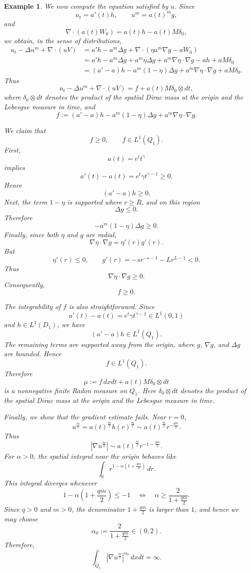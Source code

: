 \documentclass{amsart}
\newtheorem{example}[defn]{Example}
\numberwithin{equation}{section}
\begin{document}
\begin{example}
We now compute the equation satisfied by \(u\). Since
\[
u_t=a'(t)h,
\qquad
u^m=a(t)^m g,
\]
and
\[
\nabla\cdot(a(t)W_0)
=
a(t)h-a(t)M\delta_0,
\]
we obtain, in the sense of distributions,
\[
\begin{aligned}
u_t-\Delta u^m+\nabla\cdot(uV)
&=
a'h-a^m\Delta g
+
\nabla\cdot\left(\eta a^m\nabla g-aW_0\right)\\
&=
a'h-a^m\Delta g
+
a^m\eta\Delta g
+
a^m\nabla\eta\cdot\nabla g
-a h
+aM\delta_0\\
&=
(a'-a)h
-a^m(1-\eta)\Delta g
+
a^m\nabla\eta\cdot\nabla g
+
aM\delta_0.
\end{aligned}
\]
Thus
\[
u_t-\Delta u^m+\nabla\cdot(uV)
=
f+a(t)M\delta_0\otimes dt,
\]
where \(\delta_0\otimes dt\) denotes the product of the spatial Dirac mass at the origin and the Lebesgue measure in time, and
\[
f:=
(a'-a)h
-a^m(1-\eta)\Delta g
+
a^m\nabla\eta\cdot\nabla g.
\]

We claim that
\[
f\ge0,
\qquad
f\in L^1(Q_1).
\]
First,
\[
a(t)=e^t t^\gamma
\]
implies
\[
a'(t)-a(t)
=
e^t\gamma t^{\gamma-1}\ge0.
\]
Hence
\[
(a'-a)h\ge0.
\]
Next, the term \(1-\eta\) is supported where \(r\ge R\), and on this region
\[
\Delta g\le0.
\]
Therefore
\[
-a^m(1-\eta)\Delta g\ge0.
\]
Finally, since both \(\eta\) and \(g\) are radial,
\[
\nabla\eta\cdot\nabla g=\eta'(r)g'(r).
\]
But
\[
\eta'(r)\le0,
\qquad
g'(r)=-sr^{-s-1}-Lr^{L-1}<0.
\]
Thus
\[
\nabla\eta\cdot\nabla g\ge0.
\]
Consequently,
\[
f\ge0.
\]

The integrability of \(f\) is also straightforward. Since
\[
a'(t)-a(t)=e^t\gamma t^{\gamma-1}\in L^1(0,1)
\]
and \(h\in L^1(D_1)\), we have
\[
(a'-a)h\in L^1(Q_1).
\]
The remaining terms are supported away from the origin, where \(g\),
\(\nabla g\), and \(\Delta g\) are bounded. Hence
\[
f\in L^1(Q_1).
\]
Therefore
\[
\mu:=f\,dxdt+a(t)M\delta_0\otimes dt
\]
is a nonnegative finite Radon measure on \(Q_1\).
Here \(\delta_0\otimes dt\) denotes the product of the spatial Dirac mass at the origin and the Lebesgue measure in time.

Finally, we show that the gradient estimate fails. Near \(r=0\),
\[
u^{\frac{m}{2}}
=
a(t)^{\frac{m}{2}}h(r)^{\frac{m}{2}}
\sim
a(t)^{\frac{m}{2}}r^{-\frac{qm}{2}}.
\]
Thus
\[
\left|\nabla u^{\frac{m}{2}}\right|
\sim
a(t)^{\frac{m}{2}}r^{-1-\frac{qm}{2}}.
\]
For \(\alpha>0\), the spatial integral near the origin behaves like
\[
\int_0 r^{1-\alpha\left(1+\frac{qm}{2}\right)}\,dr.
\]
This integral diverges whenever
\[
1-\alpha\left(1+\frac{qm}{2}\right)\le -1
\quad \Longleftrightarrow \quad
\alpha\ge \frac{2}{1+\frac{qm}{2}}.
\]
Since \(q>0\) and \(m>0\), the denominator $1+\frac{qm}{2}$ is larger than \(1\), and hence we may choose
\[
\alpha_0:=
\frac{2}{1+\frac{qm}{2}}\in(0,2).
\]
Therefore,
\[
\int_{Q_1}
\left|\nabla u^{\frac{m}{2}}\right|^{\alpha_0}\,dxdt
=
\infty.
\]
\end{example}
\end{document}
